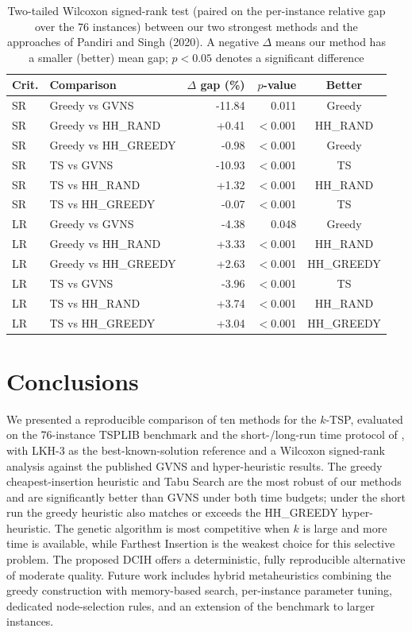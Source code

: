 \documentclass[sn-chicago]{sn-jnl}
\begin{document}
\begin{table}[t]
\centering
\caption{Two-tailed Wilcoxon signed-rank test (paired on the per-instance relative gap over the 76 instances) between our two strongest methods and the approaches of Pandiri and Singh (2020). A negative $\Delta$ means our method has a smaller (better) mean gap; $p<0.05$ denotes a significant difference}
\label{tab:wilcoxon}
\begin{tabular}{llrrc}
\hline
Crit. & Comparison & $\Delta$ gap (\%) & $p$-value & Better \\
\hline
SR & Greedy vs GVNS & -11.84 & 0.011 & Greedy \\
SR & Greedy vs HH\_RAND & +0.41 & $<$0.001 & HH\_RAND \\
SR & Greedy vs HH\_GREEDY & -0.98 & $<$0.001 & Greedy \\
SR & TS vs GVNS & -10.93 & $<$0.001 & TS \\
SR & TS vs HH\_RAND & +1.32 & $<$0.001 & HH\_RAND \\
SR & TS vs HH\_GREEDY & -0.07 & $<$0.001 & TS \\
\hline
LR & Greedy vs GVNS & -4.38 & 0.048 & Greedy \\
LR & Greedy vs HH\_RAND & +3.33 & $<$0.001 & HH\_RAND \\
LR & Greedy vs HH\_GREEDY & +2.63 & $<$0.001 & HH\_GREEDY \\
LR & TS vs GVNS & -3.96 & $<$0.001 & TS \\
LR & TS vs HH\_RAND & +3.74 & $<$0.001 & HH\_RAND \\
LR & TS vs HH\_GREEDY & +3.04 & $<$0.001 & HH\_GREEDY \\
\hline
\end{tabular}
\end{table}


\section{Conclusions}\label{sec:conclusions}

We presented a reproducible comparison of ten methods for the $k$-TSP, evaluated on
the 76-instance TSPLIB benchmark and the short-/long-run time protocol of
\citet{pandiri2020}, with LKH-3 as the best-known-solution reference and a
Wilcoxon signed-rank analysis against the published GVNS and hyper-heuristic
results. The greedy cheapest-insertion heuristic and Tabu Search are the most
robust of our methods and are significantly better than GVNS under both time
budgets; under the short run the greedy heuristic also matches or exceeds the
HH\_GREEDY hyper-heuristic. The genetic algorithm is most competitive when $k$ is
large and more time is available, while Farthest Insertion is the weakest choice
for this selective problem. The proposed DCIH offers a deterministic,
fully reproducible alternative of moderate quality. Future work includes hybrid
metaheuristics combining the greedy construction with memory-based search,
per-instance parameter tuning, dedicated node-selection rules, and an extension of
the benchmark to larger instances.
\end{document}
